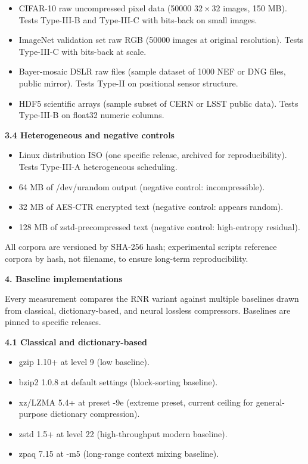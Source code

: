\documentclass[
]{article}
\begin{document}
\begin{itemize}
\item
  CIFAR-10 raw uncompressed pixel data (50000 $32 \times 32$
  images, 150 MB). Tests Type-III-B and Type-III-C with bits-back on
  small images.
\item
  ImageNet validation set raw RGB (50000 images at original resolution).
  Tests Type-III-C with bits-back at scale.
\item
  Bayer-mosaic DSLR raw files (sample dataset of 1000 NEF or DNG files,
  public mirror). Tests Type-II on positional sensor structure.
\item
  HDF5 scientific arrays (sample subset of CERN or LSST public data).
  Tests Type-III-B on float32 numeric columns.
\end{itemize}

\textbf{3.4 Heterogeneous and negative controls}

\begin{itemize}
\item
  Linux distribution ISO (one specific release, archived for
  reproducibility). Tests Type-III-A heterogeneous scheduling.
\item
  64 MB of /dev/urandom output (negative control: incompressible).
\item
  32 MB of AES-CTR encrypted text (negative control: appears random).
\item
  128 MB of zstd-precompressed text (negative control: high-entropy
  residual).
\end{itemize}

All corpora are versioned by SHA-256 hash; experimental scripts
reference corpora by hash, not filename, to ensure long-term
reproducibility.

\textbf{4. Baseline implementations}

Every measurement compares the RNR variant against multiple baselines
drawn from classical, dictionary-based, and neural lossless compressors.
Baselines are pinned to specific releases.

\textbf{4.1 Classical and dictionary-based}

\begin{itemize}
\item
  gzip 1.10+ at level 9 (low baseline).
\item
  bzip2 1.0.8 at default settings (block-sorting baseline).
\item
  xz/LZMA 5.4+ at preset -9e (extreme preset, current ceiling for
  general-purpose dictionary compression).
\item
  zstd 1.5+ at level 22 (high-throughput modern baseline).
\item
  zpaq 7.15 at -m5 (long-range context mixing baseline).
\end{itemize}
\end{document}
